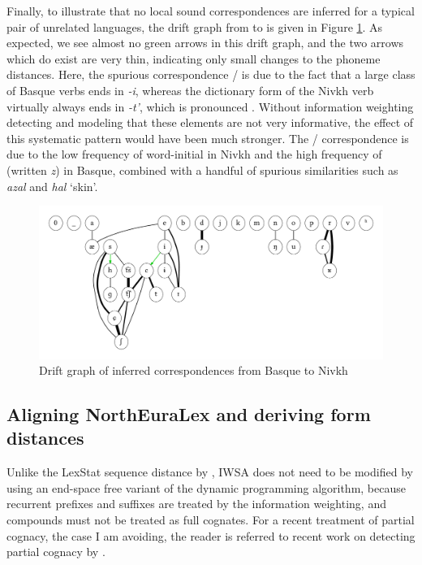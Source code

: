 Finally, to illustrate that no local sound correspondences are inferred for a typical pair of unrelated languages, the drift graph from  to  is given in Figure \ref{fig:driftGraphEuNiv}. As expected, we see almost no green arrows in this drift graph, and the two arrows which do exist are very thin, indicating only small changes to the phoneme distances. Here, the spurious correspondence \ipa{[i]}/\ipa{[c]} is due to the fact that a large class of Basque verbs ends in \textit{-i}, whereas the dictionary form of the Nivkh verb virtually always ends in \textit{-t'}, which is pronounced \ipa{[c]}. Without information weighting detecting and modeling that these elements are not very informative, the effect of this systematic pattern would have been much stronger. The \ipa{[s]}/\ipa{[h]} correspondence is due to the low frequency of word-initial \ipa{[h]} in Nivkh and the high frequency of \ipa{[s]} (written \textit{z}) in Basque, combined with a handful of spurious similarities such as \textit{azal} and \textit{hal} `skin'.

\begin{figure}
    \includegraphics[width=\textwidth]{figures/drift-graph-eu-niv.pdf}
    \caption{Drift graph of inferred correspondences from Basque to Nivkh}
    \label{fig:driftGraphEuNiv}
\end{figure}

\subsection{Aligning NorthEuraLex and deriving form distances}

Unlike the LexStat sequence distance by \cite{list2012}, IWSA does not need to be modified by using an end-space free variant of the dynamic programming algorithm, because recurrent prefixes and suffixes are treated by the information weighting, and compounds must not be treated as full cognates. For a recent treatment of partial cognacy, the case I am avoiding, the reader is referred to recent work on detecting partial cognacy by \cite{list_ea_2016}.

